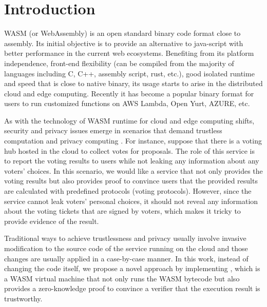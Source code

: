 \section{Introduction}
WASM (or WebAssembly) is an open standard binary code format close to assembly. Its initial objective is to provide an alternative to java-script with better performance in the current web ecosystems. Benefiting from its platform independence, front-end flexibility (can be compiled from the majority of languages including C, C++, assembly script, rust, etc.), good isolated runtime and speed that is close to native binary, its usage starts to arise in the distributed cloud and edge computing. Recently it has become a popular binary format for users to run customized functions on AWS Lambda, Open Yurt, AZURE, etc.

As with the technology of WASM runtime for cloud and edge computing shifts, security and privacy \cite{pearson2009taking, gadepalli2020sledge-wasmsec} issues emerge in scenarios that demand trustless computation \cite{wood2016trustless, chang2002trustless, mcfadden2018security} and privacy computing \cite{xiao2012security,takabi2010security}. For instance, suppose that there is a voting hub hosted in the cloud to collect votes for proposals. The role of this service is to report the voting results to users while not leaking any information about any voters' choices. In this scenario, we would like a service that not only provides the voting results but also provides proof to convince users that the provided results are calculated with predefined protocols (voting protocols). However, since the service cannot leak voters' personal choices, it should not reveal any information about the voting tickets that are signed by voters, which makes it tricky to provide evidence of the result. 

Traditional ways to achieve trustlessness and privacy usually involve invasive modification \cite{jin2012proof-tl,chong2013enforcing-tl, crary2003foundational-tl, azzedin2002evolving-tl} to the source code of the service running on the cloud and those changes are usually applied in a case-by-case manner. In this work, instead of changing the code itself, we propose a novel approach by implementing \zkwasm, which is a WASM virtual machine that not only runs the WASM bytecode but also provides a zero-knowledge proof to convince a verifier that the execution result is trustworthy.

